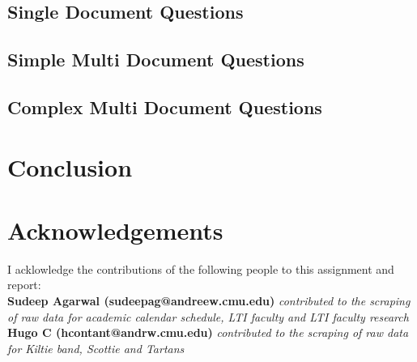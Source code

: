 \documentclass[11pt]{article}
\begin{document}
\subsection{Single Document Questions}

\subsection{Simple Multi Document Questions}

\subsection {Complex Multi Document Questions}
\section{Conclusion}


\clearpage
\section*{Acknowledgements}
I acklowledge the contributions of the following people to this assignment and report:
\\
\textbf{Sudeep Agarwal (sudeepag@andreew.cmu.edu)} \textit{contributed to the scraping of raw data for academic calendar schedule, LTI faculty and LTI faculty research}
\\
\textbf{Hugo C (hcontant@andrw.cmu.edu)} \textit{contributed to the scraping of raw data for Kiltie band, Scottie and Tartans}


\end{document}
